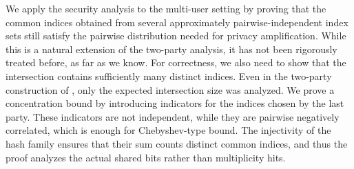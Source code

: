 We apply the security analysis to the multi-user setting by proving that the common indices obtained from several approximately pairwise-independent index sets still satisfy the pairwise distribution needed for privacy amplification. While this is a natural extension of the two-party analysis, it has not been rigorously treated before, as far as we know.
For correctness, we also need to show that the intersection contains sufficiently many distinct indices. Even in the two-party construction of \cite{C:CacMau97}, only the expected intersection size was analyzed. We prove a concentration bound by introducing indicators for the indices chosen by the last party. These indicators are not independent, while they are pairwise negatively correlated, which is enough for Chebyshev-type bound. The injectivity of the hash family ensures that their sum counts distinct common indices, and thus the proof analyzes the actual shared bits rather than multiplicity hits.


